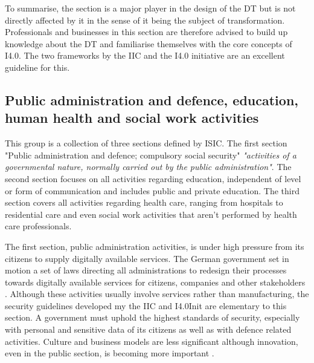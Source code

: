 To summarise, the section is a major player in the design of the \ac{DT} but is not directly affected by it in the sense of it being the subject of transformation. Professionals and businesses in this section are therefore advised to build up knowledge about the \ac{DT} and familiarise themselves with the core concepts of \ac{I4.0}. The two frameworks by the \ac{IIC} and the \ac{I4.0} initiative are an excellent guideline for this.

\subsection{Public administration and defence, education, human health and social work activities}

This group is a collection of  three  sections  defined  by \ac{ISIC}. The first section "Public administration and defence; compulsory social security" \emph{"activities of a governmental nature, normally carried out by the public administration"}\cite[p.243]{ISIC:2008}. The second section focuses on all activities regarding education, independent of level or form of communication and includes public and private education. The third section covers all activities regarding health care, ranging from hospitals to residential care and even social work activities that aren't performed by health care professionals\cite[p.254ff]{ISIC:2008}.

The first section, public administration activities, is under high pressure from its citizens to supply digitally available services. The German government set in motion a set of laws directing all administrations to redesign their processes towards digitally available services for citizens, companies and other stakeholders \cite{verwaltung:2014}. Although these activities usually involve services rather than manufacturing, the security guidelines developed my the \ac{IIC} and \ac{I4.0Init} are elementary to this section. A government must uphold the highest standards of security, especially with personal and sensitive data of its citizens as well as with defence related activities. Culture and business models are less significant although innovation, even in the public section, is becoming more important \cite{derivwhitehouse:2016}. 

